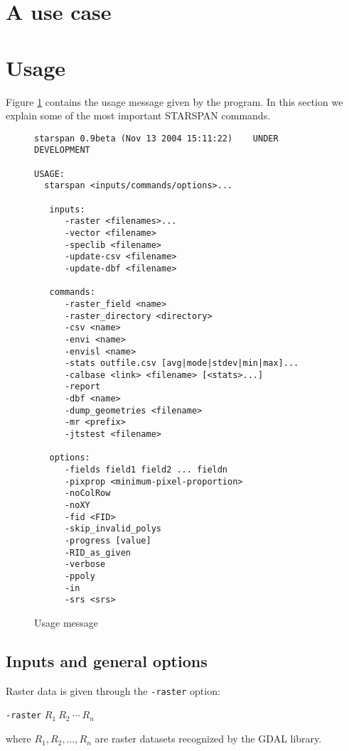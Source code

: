 \documentclass{elsart}
\newcommand{\starspan}{STARSPAN{}}
\begin{document}
\section{A use case}

\section{Usage}

Figure \ref{fig-usage} contains the usage message given by the program.
In this section we explain some of the most important \starspan{} commands.
\begin{figure}[!ht]
\centering
\caption{Usage message}
\scriptsize{
\begin{verbatim}
starspan 0.9beta (Nov 13 2004 15:11:22)    UNDER DEVELOPMENT

USAGE:
  starspan <inputs/commands/options>...

   inputs:
      -raster <filenames>...
      -vector <filename>
      -speclib <filename>
      -update-csv <filename>
      -update-dbf <filename>

   commands:
      -raster_field <name>
      -raster_directory <directory>
      -csv <name>
      -envi <name>
      -envisl <name>
      -stats outfile.csv [avg|mode|stdev|min|max]...
      -calbase <link> <filename> [<stats>...]
      -report
      -dbf <name>
      -dump_geometries <filename>
      -mr <prefix>
      -jtstest <filename>

   options:
      -fields field1 field2 ... fieldn
      -pixprop <minimum-pixel-proportion>
      -noColRow
      -noXY
      -fid <FID>
      -skip_invalid_polys
      -progress [value]
      -RID_as_given
      -verbose
      -ppoly
      -in
      -srs <srs>
\end{verbatim}
}
\label{fig-usage}
\end{figure}

\subsection{Inputs and general options}

Raster data is given through the \verb|-raster| option:

	\verb|-raster| $R_1\ R_2\ \cdots\ R_n$

where $R_1, R_2, \ldots, R_n$ are raster datasets recognized by the GDAL library.
\end{document}
